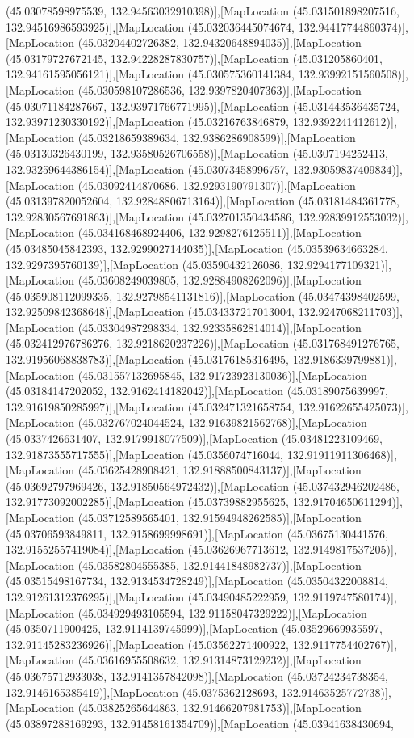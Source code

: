 (45.03078598975539, 132.94563032910398)],[MapLocation (45.031501898207516, 132.94516986593925)],[MapLocation (45.032036445074674, 132.94417744860374)],[MapLocation (45.03204402726382, 132.94320648894035)],[MapLocation (45.03179727672145, 132.94228287830757)],[MapLocation (45.031205860401, 132.94161595056121)],[MapLocation (45.030575360141384, 132.93992151560508)],[MapLocation (45.030598107286536, 132.9397820407363)],[MapLocation (45.03071184287667, 132.93971766771995)],[MapLocation (45.031443536435724, 132.93971230330192)],[MapLocation (45.03216763846879, 132.9392241412612)],[MapLocation (45.03218659389634, 132.9386286908599)],[MapLocation (45.03130326430199, 132.93580526706558)],[MapLocation (45.0307194252413, 132.93259644386154)],[MapLocation (45.03073458996757, 132.93059837409834)],[MapLocation (45.03092414870686, 132.9293190791307)],[MapLocation (45.031397820052604, 132.92848806713164)],[MapLocation (45.03181484361778, 132.92830567691863)],[MapLocation (45.032701350434586, 132.92839912553032)],[MapLocation (45.034168468924406, 132.9298276125511)],[MapLocation (45.03485045842393, 132.9299027144035)],[MapLocation (45.03539634663284, 132.9297395760139)],[MapLocation (45.03590432126086, 132.9294177109321)],[MapLocation (45.03608249039805, 132.92884908262096)],[MapLocation (45.035908112099335, 132.92798541131816)],[MapLocation (45.03474398402599, 132.92509842368648)],[MapLocation (45.034337217013004, 132.9247068211703)],[MapLocation (45.03304987298334, 132.92335862814014)],[MapLocation (45.032412976786276, 132.9218620237226)],[MapLocation (45.031768491276765, 132.91956068838783)],[MapLocation (45.03176185316495, 132.9186339799881)],[MapLocation (45.031557132695845, 132.91723923130036)],[MapLocation (45.03184147202052, 132.9162414182042)],[MapLocation (45.03189075639997, 132.91619850285997)],[MapLocation (45.032471321658754, 132.91622655425073)],[MapLocation (45.032767024044524, 132.91639821562768)],[MapLocation (45.0337426631407, 132.9179918077509)],[MapLocation (45.03481223109469, 132.91873555717555)],[MapLocation (45.0356074716044, 132.91911911306468)],[MapLocation (45.03625428908421, 132.91888500843137)],[MapLocation (45.03692797969426, 132.91850564972432)],[MapLocation (45.037432946202486, 132.91773092002285)],[MapLocation (45.03739882955625, 132.91704650611294)],[MapLocation (45.03712589565401, 132.91594948262585)],[MapLocation (45.03706593849811, 132.9158699998691)],[MapLocation (45.03675130441576, 132.91552557419084)],[MapLocation (45.03626967713612, 132.9149817537205)],[MapLocation (45.03582804555385, 132.91441848982737)],[MapLocation (45.03515498167734, 132.9134534728249)],[MapLocation (45.03504322008814, 132.91261312376295)],[MapLocation (45.03490485222959, 132.9119747580174)],[MapLocation (45.034929493105594, 132.91158047329222)],[MapLocation (45.0350711900425, 132.9114139745999)],[MapLocation (45.03529669935597, 132.91145283236926)],[MapLocation (45.03562271400922, 132.9117754402767)],[MapLocation (45.03616955508632, 132.91314873129232)],[MapLocation (45.03675712933038, 132.9141357842098)],[MapLocation (45.03724234738354, 132.9146165385419)],[MapLocation (45.0375362128693, 132.91463525772738)],[MapLocation (45.03825265644863, 132.91466207981753)],[MapLocation (45.03897288169293, 132.91458161354709)],[MapLocation (45.03941638430694, 